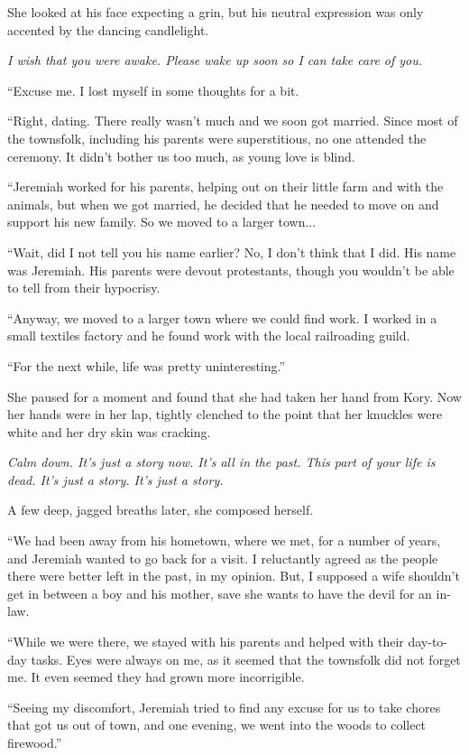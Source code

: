 She looked at his face expecting a grin, but his neutral expression was only accented by the dancing candlelight.

\textit{I wish that you were awake. Please wake up soon so I can take care of you.}

``Excuse me. I lost myself in some thoughts for a bit.

``Right, dating. There really wasn't much and we soon got married. Since most of the townsfolk, including his parents were superstitious, no one attended the ceremony. It didn't bother us too much, as young love is blind.

``Jeremiah worked for his parents, helping out on their little farm and with the animals, but when we got married, he decided that he needed to move on and support his new family. So we moved to a larger town...

``Wait, did I not tell you his name earlier? No, I don't think that I did. His name was Jeremiah. His parents were devout protestants, though you wouldn't be able to tell from their hypocrisy.

``Anyway, we moved to a larger town where we could find work. I worked in a small textiles factory and he found work with the local railroading guild.

``For the next while, life was pretty uninteresting.''

She paused for a moment and found that she had taken her hand from Kory. Now her hands were in her lap, tightly clenched to the point that her knuckles were white and her dry skin was cracking.

\textit{Calm down. It's just a story now. It's all in the past. This part of your life is dead. It's just a story. It's just a story.}

A few deep, jagged breaths later, she composed herself.

``We had been away from his hometown, where we met, for a number of years, and Jeremiah wanted to go back for a visit. I reluctantly agreed as the people there were better left in the past, in my opinion. But, I supposed a wife shouldn't get in between a boy and his mother, save she wants to have the devil for an in-law.

``While we were there, we stayed with his parents and helped with their day-to-day tasks. Eyes were always on me, as it seemed that the townsfolk did not forget me. It even seemed they had grown more incorrigible.

``Seeing my discomfort, Jeremiah tried to find any excuse for us to take chores that got us out of town, and one evening, we went into the woods to collect firewood.''

